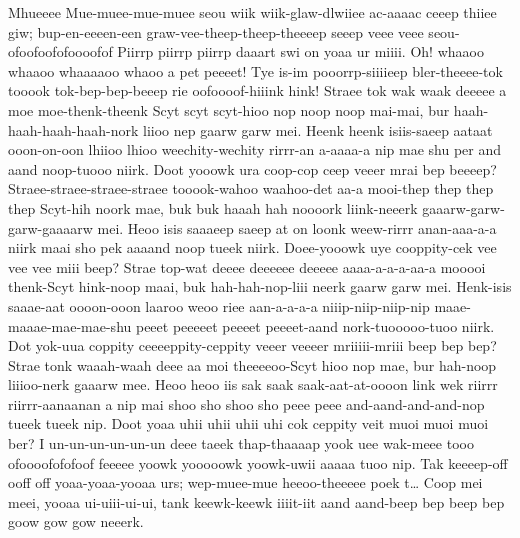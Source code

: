 \documentclass[12pt,a4paper]{article}
\begin{document}
\begin{drama}
\poetspeaks
Mhueeee Mue-muee-mue-muee seou wiik wiik-glaw-dlwiiee ac-aaaac ceeep thiiee giw; bup-en-eeeen-een graw-vee-theep-theep-theeeep seeep veee veee seou-ofoofoofofoooofof Piirrp piirrp piirrp daaart swi on yoaa ur miiii.
\pistspeaks
Oh! whaaoo whaaoo whaaaaoo whaoo a pet peeeet! Tye is-im pooorrp-siiiieep bler-theeee-tok tooook tok-bep-bep-beeep rie oofoooof-hiiink hink!
\poetspeaks
Straee tok wak waak deeeee a moe moe-thenk-theenk Scyt scyt scyt-hioo nop noop noop mai-mai, bur haah-haah-haah-haah-nork liioo nep gaarw garw mei. Heenk heenk isiis-saeep aataat ooon-on-oon lhiioo lhioo weechity-wechity rirrr-an a-aaaa-a nip mae shu per and aand noop-tuooo niirk. Doot yooowk ura coop-cop ceep veeer mrai bep beeeep? Straee-straee-straee-straee tooook-wahoo waahoo-det aa-a mooi-thep thep thep thep Scyt-hih noork mae, buk buk haaah hah noooork liink-neeerk gaaarw-garw-garw-gaaaarw mei. Heoo isis saaaeep saeep at on loonk weew-rirrr anan-aaa-a-a niirk maai sho pek aaaand noop tueek niirk. Doee-yooowk uye cooppity-cek vee vee vee miii beep? Strae top-wat deeee deeeeee deeeee aaaa-a-a-a-aa-a mooooi thenk-Scyt hink-noop maai, buk hah-hah-nop-liii neerk gaarw garw mei. Henk-isis saaae-aat oooon-ooon laaroo weoo riee aan-a-a-a-a niiip-niip-niip-nip maae-maaae-mae-mae-shu peeet peeeeet peeeet peeeet-aand nork-tuooooo-tuoo niirk. Dot yok-uua coppity ceeeeppity-ceppity veeer veeeer mriiiii-mriii beep bep bep? Strae tonk waaah-waah deee aa moi theeeeoo-Scyt hioo nop mae, bur hah-noop liiioo-nerk gaaarw mee. Heoo heoo iis sak saak saak-aat-at-oooon link wek riirrr riirrr-aanaanan a nip mai shoo sho shoo sho peee peee and-aand-and-and-nop tueek tueek nip. Doot yoaa uhii uhii uhii uhi cok ceppity veit muoi muoi muoi ber?
\pistspeaks
I un-un-un-un-un-un deee taeek thap-thaaaap yook uee wak-meee tooo ofoooofofofoof feeeee yoowk yooooowk yoowk-uwii aaaaa tuoo nip.  Tak keeeep-off ooff off yoaa-yoaa-yooaa urs; wep-muee-mue heeoo-theeeee poek t… Coop mei meei, yooaa ui-uiii-ui-ui, tank keewk-keewk iiiit-iit aand aand-beep bep beep bep goow gow gow neeerk.
\poetspeaks

\end{drama}
\end{document}
